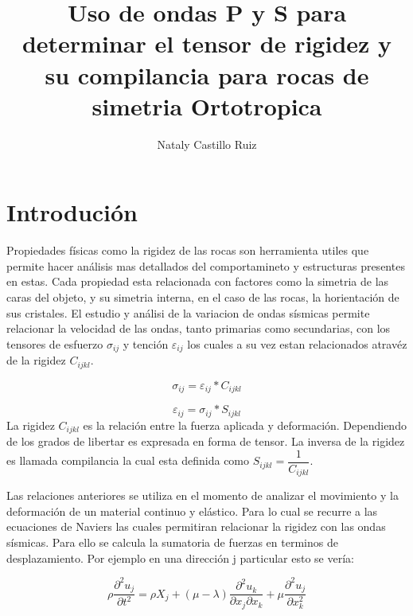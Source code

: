 \documentclass{article}
\title{Uso de ondas P y S para determinar el tensor de rigidez y su compilancia para rocas  de  simetria Ortotropica}
\author{Nataly Castillo Ruiz}
\begin{document}
\maketitle
\date{}

\begin{abstract}
 
\end{abstract}

\section{Introduci\'on}

Propiedades f\'isicas  como la  rigidez de las rocas son  herramienta utiles  que permite hacer  an\'alisis mas  detallados  del  comportamineto y estructuras presentes en estas. Cada propiedad esta relacionada con factores como la simetria de las caras del objeto, y su simetria interna, en el caso de las rocas, la horientaci\'on de sus cristales. El  estudio y  an\'alisi de la variacion de ondas s\'ismicas  permite relacionar la velocidad de las ondas, tanto primarias como secundarias, con  los tensores   de   esfuerzo  $\sigma_{ij}$ y  tención $\varepsilon_{ij}$ los  cuales  a su vez estan relacionados  atravéz  de  la rigidez $C_{ijkl}$. 

\begin{equation}
 \sigma_{ij}=\varepsilon_{ij}*C_{ijkl}
\end{equation}

\begin{equation}
 \varepsilon_{ij}=\sigma_{ij}*S_{ijkl}
\end{equation}
La rigidez $C_{ijkl}$ es  la relaci\'on entre la fuerza aplicada y deformaci\'on. Dependiendo de los grados de libertar es expresada en forma de tensor. La inversa de la rigidez es llamada  compilancia la cual esta  definida como $S_{ijkl} = \dfrac{1}{C_{ijkl}}$. 

Las relaciones anteriores  se utiliza  en el momento de analizar el movimiento y la  deformación de  un material continuo y elástico. Para lo cual se recurre a las ecuaciones  de  Navier\’s las cuales permitiran relacionar la rigidez con las ondas s\'ismicas. Para ello se calcula la sumatoria de  fuerzas en terminos de desplazamiento. Por ejemplo en una  dirección j particular esto se vería:  


\begin{equation}
 {\rho}\dfrac{\partial^{2}{u_{j}}}{\partial{t}^{2}}=\rho X_{j}+(\mu-\lambda)\dfrac{\partial^{2}{u_{k}}}{\partial{x_{j}}\partial{x_{k}}}+ \mu \dfrac{\partial^{2}{u_{j}}}{\partial{x_{k}^{2}}}
\end{equation}
\end{document}
